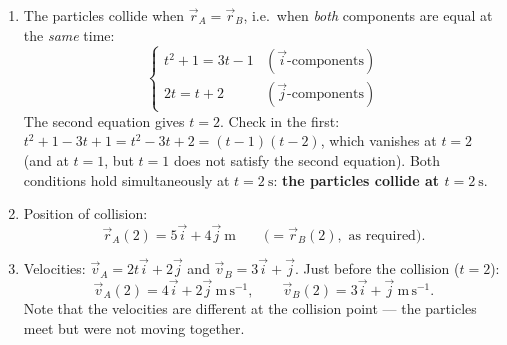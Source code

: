 \documentclass[11pt]{article}
\begin{document}
\begin{corrige}
\begin{enumerate}
\item The particles collide when $\vec{r}_A = \vec{r}_B$, i.e.\ when \emph{both} components are equal at the \emph{same} time:
\[ \begin{cases} t^2 + 1 = 3t - 1 & (\vec{i}\text{-components}) \\ 2t = t + 2 & (\vec{j}\text{-components}) \end{cases} \]
The second equation gives $t = 2$. Check in the first: $t^2 + 1 - 3t + 1 = t^2 - 3t + 2 = (t-1)(t-2)$, which vanishes at $t = 2$ (and at $t = 1$, but $t = 1$ does not satisfy the second equation). Both conditions hold simultaneously at $t = 2\ \mathrm{s}$: \textbf{the particles collide at $t = 2\ \mathrm{s}$}.
\item Position of collision:
\[ \vec{r}_A(2) = 5\vec{i} + 4\vec{j}\ \mathrm{m} \qquad \bigl(= \vec{r}_B(2), \text{ as required}\bigr). \]
\item Velocities: $\vec{v}_A = 2t\vec{i} + 2\vec{j}$ and $\vec{v}_B = 3\vec{i} + \vec{j}$. Just before the collision ($t = 2$):
\[ \vec{v}_A(2) = 4\vec{i} + 2\vec{j}\ \mathrm{m\,s^{-1}}, \qquad \vec{v}_B(2) = 3\vec{i} + \vec{j}\ \mathrm{m\,s^{-1}}. \]
Note that the velocities are different at the collision point — the particles meet but were not moving together.
\end{enumerate}
\end{corrige}
\end{document}
